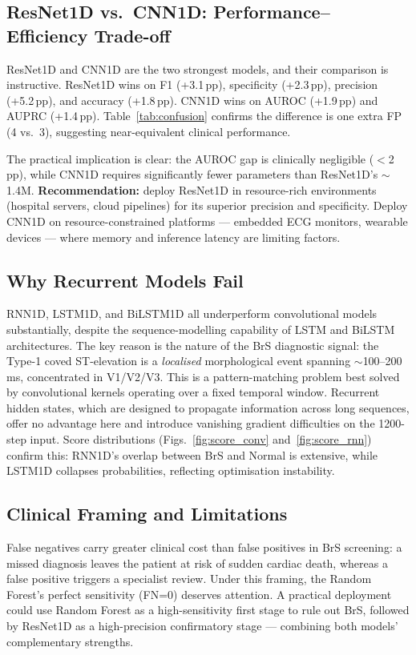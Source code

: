 \documentclass[journal, 10pt, twoside]{IEEEtran}
\begin{document}
\subsection{ResNet1D vs.\ CNN1D: Performance--Efficiency Trade-off}
\label{sec:cnn_vs_resnet}

ResNet1D and CNN1D are the two strongest models, and their comparison
is instructive.
ResNet1D wins on F1 (+3.1\,pp), specificity (+2.3\,pp), precision
(+5.2\,pp), and accuracy (+1.8\,pp).
CNN1D wins on AUROC (+1.9\,pp) and AUPRC (+1.4\,pp).
Table~\ref{tab:confusion} confirms the difference is one extra FP
(4 vs.\ 3), suggesting near-equivalent clinical performance.

The practical implication is clear: the AUROC gap is clinically
negligible ($<$2\,pp), while CNN1D requires significantly fewer
parameters than ResNet1D's $\sim$1.4M.
\textbf{Recommendation:} deploy ResNet1D in resource-rich
environments (hospital servers, cloud pipelines) for its superior
precision and specificity.
Deploy CNN1D on resource-constrained platforms — embedded ECG
monitors, wearable devices — where memory and inference latency
are limiting factors.

\subsection{Why Recurrent Models Fail}

RNN1D, LSTM1D, and BiLSTM1D all underperform convolutional models
substantially, despite the sequence-modelling capability of LSTM
and BiLSTM architectures.
The key reason is the nature of the BrS diagnostic signal: the
Type-1 coved ST-elevation is a \textit{localised} morphological
event spanning $\sim$100--200\,ms, concentrated in V1/V2/V3.
This is a pattern-matching problem best solved by convolutional
kernels operating over a fixed temporal window.
Recurrent hidden states, which are designed to propagate information
across long sequences, offer no advantage here and introduce
vanishing gradient difficulties on the 1200-step input.
Score distributions (Figs.~\ref{fig:score_conv} and~\ref{fig:score_rnn}) confirm this:
RNN1D's overlap between BrS and Normal is extensive, while
LSTM1D collapses probabilities, reflecting optimisation instability.

\subsection{Clinical Framing and Limitations}

False negatives carry greater clinical cost than false positives in
BrS screening: a missed diagnosis leaves the patient at risk of
sudden cardiac death, whereas a false positive triggers a specialist
review.
Under this framing, the Random Forest's perfect sensitivity (FN=0)
deserves attention.
A practical deployment could use Random Forest as a high-sensitivity
first stage to rule out BrS, followed by ResNet1D as a high-precision
confirmatory stage — combining both models' complementary strengths.
\end{document}
